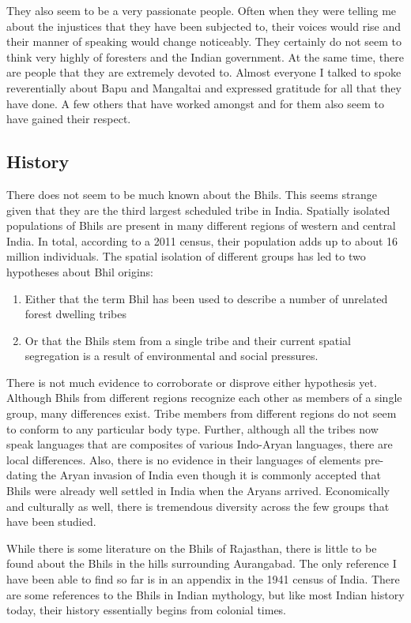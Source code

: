 \documentclass[report.tex]{subfiles}
\begin{document}
They also seem to be a very passionate people. Often when they were telling me about the injustices that they have been subjected to, their voices would rise and their manner of speaking would change noticeably. They certainly do not seem to think very highly of foresters and the Indian government. At the same time, there are people that they are extremely devoted to. Almost everyone I talked to spoke reverentially about Bapu and Mangaltai and expressed gratitude for all that they have done. A few others that have worked amongst and for them also seem to have gained their respect.

\subsection{History}

There does not seem to be much known about the Bhils. This seems strange given that they are the third largest scheduled tribe in India. Spatially isolated populations of Bhils are present in many different regions of western and central India. In total, according to a 2011 census, their population adds up to about 16 million individuals. The spatial isolation of different groups has led to two hypotheses about Bhil origins:
\begin{enumerate}
\item Either that the term Bhil has been used to describe a number of unrelated forest dwelling tribes
\item Or that the Bhils stem from a single tribe and their current spatial segregation is a result of environmental and social pressures.
\end{enumerate}

There is not much evidence to corroborate or disprove either hypothesis yet. Although Bhils from different regions recognize each other as members of a single group, many differences exist. Tribe members from different regions do not seem to conform to any particular body type. Further, although all the tribes now speak languages that are composites of various Indo-Aryan languages, there are local differences. Also, there is no evidence in their languages of elements pre-dating the Aryan invasion of India even though it is commonly accepted that Bhils were already well settled in India when the Aryans arrived. Economically and culturally as well, there is tremendous diversity across the few groups that have been studied.

While there is some literature on the Bhils of Rajasthan, there is little to be found about the Bhils in the hills surrounding Aurangabad. The only reference I have been able to find so far is in an appendix in the 1941 census of India. There are some references to the Bhils in Indian mythology, but like most Indian history today, their history essentially begins from colonial times.
\end{document}
